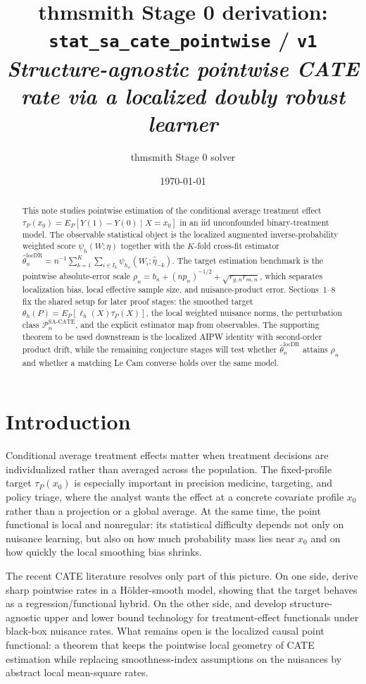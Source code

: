 \documentclass[11pt]{article}
\title{thmsmith Stage 0 derivation: \texttt{stat\_sa\_cate\_pointwise} / \texttt{v1}%
  \\ \large\textit{Structure-agnostic pointwise CATE rate via a localized doubly robust learner}}
\author{thmsmith Stage 0 solver}
\date{\today}
\theoremstyle{definition}
\theoremstyle{plain}
\theoremstyle{remark}
\begin{document}
\maketitle


\begin{abstract}
This note studies pointwise estimation of the conditional average treatment effect
$\tau_P(x_0)=E_P[Y(1)-Y(0)\mid X=x_0]$ in an iid unconfounded binary-treatment model.
The observable statistical object is the localized augmented inverse-probability weighted score
$\psi_h(W;\eta)$ together with the $K$-fold cross-fit estimator
$\hat\theta_n^{\mathrm{locDR}}=n^{-1}\sum_{k=1}^K\sum_{i\in I_k}\psi_{h_n}(W_i;\hat\eta_{-k})$.
The target estimation benchmark is the pointwise absolute-error scale
$\rho_n=b_n+(n p_n)^{-1/2}+\sqrt{r_{g,n}r_{m,n}}$, which separates localization bias,
local effective sample size, and nuisance-product error.
Sections~1--8 fix the shared setup for later proof stages: the smoothed target
$\theta_h(P)=E_P[\ell_h(X)\tau_P(X)]$, the local weighted nuisance norms, the perturbation class
$\mathcal{P}_n^{\mathrm{SA\text{-}CATE}}$, and the explicit estimator map from observables.
The supporting theorem to be used downstream is the localized AIPW identity with second-order product
drift, while the remaining conjecture stages will test whether $\hat\theta_n^{\mathrm{locDR}}$
attains $\rho_n$ and whether a matching Le Cam converse holds over the same model.
\end{abstract}

\section{Introduction}
Conditional average treatment effects matter when treatment decisions are individualized rather than
averaged across the population. The fixed-profile target $\tau_P(x_0)$ is especially important in
precision medicine, targeting, and policy triage, where the analyst wants the effect at a concrete
covariate profile $x_0$ rather than a projection or a global average. At the same time, the point
functional is local and nonregular: its statistical difficulty depends not only on nuisance learning,
but also on how much probability mass lies near $x_0$ and on how quickly the local smoothing bias
shrinks.

The recent CATE literature resolves only part of this picture. On one side,
\citet{KennedyBalakrishnanRobinsWasserman2024MinimaxCATE} derive sharp pointwise rates in a
H\"older-smooth model, showing that the target behaves as a regression/functional hybrid. On the
other side, \citet{JinSyrgkanis2024StructureAgnosticDR} and
\citet{JinSyrgkanis2025GeneralLinearFunctionalLowerBounds} develop structure-agnostic upper and lower
bound technology for treatment-effect functionals under black-box nuisance rates. What remains open is
the localized causal point functional: a theorem that keeps the pointwise local geometry of CATE
estimation while replacing smoothness-index assumptions on the nuisances by abstract local mean-square
rates.
\end{document}
